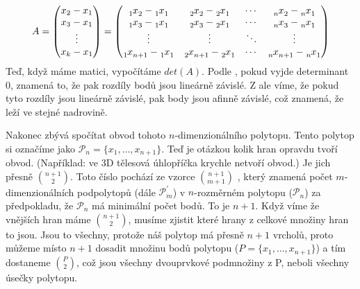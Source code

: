 \begingroup
\renewcommand*{\arraystretch}{1.25}
\delimitershortfall=0pt
\begin{equation*}
  A =
  \begin{pmatrix}
    x_2-x_1 \\
    x_3-x_1 \\
    \vdots  \\
    x_k-x_1
  \end{pmatrix}
  =
  \begin{pmatrix}
    \x{1}{2} - \x{1}{1} & \x{2}{2} - \x{2}{1} & \cdots & \x{n}{2} - \x{n}{1} \\
    \x{1}{3} - \x{1}{1} & \x{2}{3} - \x{2}{1} & \cdots & \x{n}{3} - \x{n}{1} \\
    \vdots        & \vdots        & \ddots & \vdots        \\
    \x{1}{n_+_1} - \x{1}{1} & \x{2}{n_+_1} - \x{2}{1} & \cdots & \x{n}{n_+_1} - \x{n}{1} \\
  \end{pmatrix}
\end{equation*}
\endgroup
Teď, když máme matici, vypočítáme $det(A)$. Podle , pokud vyjde determinant $0$, znamená to, že pak rozdíly bodů jsou lineárně závislé. Z  ale víme, že pokud tyto rozdíly jsou lineárně závislé, pak body jsou afinně závislé, což znamená, že leží ve stejné nadrovině.  

Nakonec zbývá spočítat obvod tohoto $n$-dimenzionálního polytopu. Tento polytop si označíme jako $\mathcal{P}_n = \{x_1, \dots, x_{n+1}\}$. Teď je otázkou kolik hran opravdu tvoří obvod. (Například: ve $3$D tělesová úhlopříčka krychle netvoří obvod.) Je jich přesně $\binom{n+1}{2}$. Toto číslo pochází ze vzorce $\binom{n+1}{m+1}$ \autocite[120]{coxeter1973regular},
který znamená počet $m$-dimenzionálních podpolytopů (dále $\mathcal{P}^{\prime}_m$) v $n$-rozměrném polytopu ($\mathcal{P}_n$) za předpokladu, že $\mathcal{P}_n$ má minimální počet bodů. To je $n+1$. 
Když víme že vnějších hran máme $\binom{n+1}{2}$, musíme zjistit které hrany z celkové množiny hran to jsou. Jsou to všechny, protože náš polytop má přesně $n+1$ vrcholů, proto můžeme místo $n+1$ dosadit množinu bodů polytopu ($P = \{x_1, \dots, x_{n+1}\}$) a tím dostaneme $\binom{P}{2}$, což jsou všechny dvouprvkové podmnožiny z P, neboli všechny úsečky polytopu.